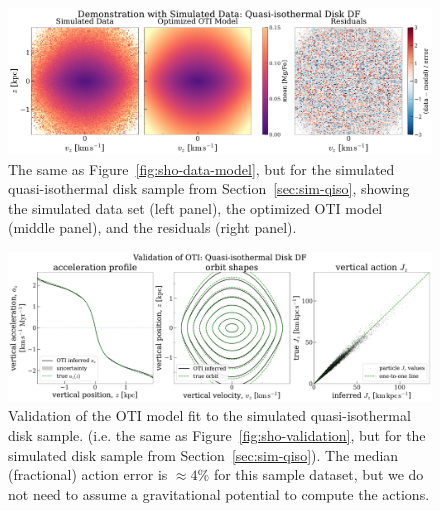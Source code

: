 \begin{figure}[t!]
\begin{center}
\includegraphics[width=\textwidth]{qiso-data-model.pdf}
\end{center}
\caption{%
The same as Figure~\ref{fig:sho-data-model}, but for the simulated quasi-isothermal disk
sample from Section~\ref{sec:sim-qiso}, showing the simulated data set (left panel), the
optimized OTI model (middle panel), and the residuals (right panel).
\label{fig:qiso-data-model}
}
\end{figure}

\begin{figure}[t!]
\begin{center}
\includegraphics[width=\textwidth]{qiso-validation.pdf}
\end{center}
\caption{%
Validation of the OTI model fit to the simulated quasi-isothermal disk sample. (i.e. the
same as Figure~\ref{fig:sho-validation}, but for the simulated disk sample from
Section~\ref{sec:sim-qiso}).
The median (fractional) action error is $\approx 4\%$ for this sample dataset, but we do
not need to assume a gravitational potential to compute the actions.
\label{fig:qiso-validation}
}
\end{figure}

